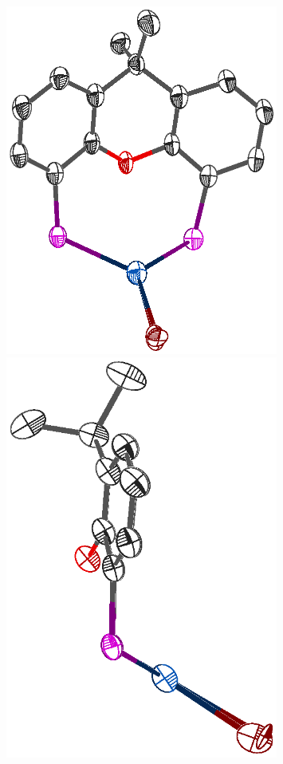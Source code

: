 \begin{figure}[h] 
\begin{center}
\vspace{0.5cm}
\begin{minipage}[c]{0.5\textwidth}
\includegraphics[width=0.8\textwidth]{../Othercrystals/AgxantphosBr.eps}
\end{minipage}%
\begin{minipage}[c]{0.4\textwidth}
\includegraphics[width=0.8\textwidth]{../Othercrystals/AgxantphosBrside.eps}

\end{minipage}
\end{center}
\end{figure}
